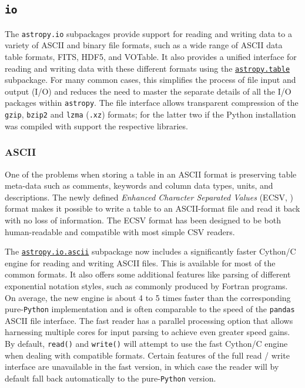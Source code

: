 \documentclass[modern]{aastex62}
\newcommand{\package}[1]{\texttt{#1}\xspace}
\newcommand{\python}{\package{Python}}
\newcommand{\astropypkg}{\package{astropy}}
\newcommand{\astropysubpkg}[1]{\href{http://docs.astropy.org/en/stable/#1/index.html}{\texttt{astropy.#1}}\xspace}
\newcommand{\astropyiosubpkg}[1]{\href{http://docs.astropy.org/en/stable/io/#1/index.html}{\texttt{astropy.io.#1}}\xspace}
\begin{document}
\subsection{\package{io}}

The \package{astropy.io} subpackages provide support for reading and writing
data to a variety of ASCII and binary file formats, such as a wide range of
ASCII data table formats, FITS, HDF5, and VOTable.
It also provides a unified interface for reading and writing data with these
different formats using the \astropysubpkg{table} subpackage.
For many common cases, this simplifies the process of file input and output (I/O) and
reduces the need to master the separate details of all the I/O packages within
\astropypkg. The file interface allows transparent compression of
the \texttt{gzip}, \texttt{bzip2} and \texttt{lzma} (\texttt{.xz})
formats; for the latter two if the Python installation was compiled
with support the respective libraries.

\subsubsection{ASCII}

One of the problems when storing a table in an ASCII format is
preserving table meta-data such as comments, keywords and column data
types, units, and descriptions. The newly defined \emph{Enhanced
Character Separated Values} (ECSV,  \citealt{ape6}) format makes it
possible to write a table to an ASCII-format file and read it back
with no loss of information. The ECSV format has been designed to be
both human-readable and compatible with most simple CSV readers.

The \astropyiosubpkg{ascii} subpackage now includes a significantly faster
Cython/C engine for reading and writing ASCII files. This is available for most
of the common formats. It also offers some additional features like parsing
of different exponential notation styles, such as commonly produced
by Fortran programs.  On average, the new engine is about 4 to 5 times faster
than the corresponding pure-\python implementation and is often comparable to
the speed of the \package{pandas} \citep{pandas} ASCII file interface.  The
fast reader has a parallel processing option that allows harnessing multiple
cores for input parsing to achieve even greater speed gains.  By default,
\texttt{read()} and \texttt{write()} will attempt to use the fast Cython/C engine
when dealing with compatible formats. Certain features of the full read
/ write interface are unavailable in the fast version, in which case the
reader will by default fall back automatically to the pure-\python version.
\end{document}

